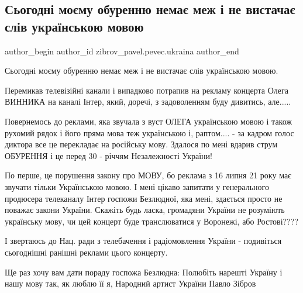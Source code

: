  
 
 
 
 
 
\subsection{Сьогодні моєму обуренню немає меж і не вистачає слів українською мовою}
\label{sec:01_08_2021.fb.zibrov_pavel.pevec.ukraina.1.kanal_inter_oleg_vinnik}
 
\ifcmt
 author_begin
   author_id zibrov_pavel.pevec.ukraina
 author_end
\fi

Сьогодні моєму обуренню немає меж і не вистачає слів українською мовою.

Перемикав телевізійні канали і випадково потрапив на рекламу концерта Олега
ВИННИКА на каналі Інтер, який, доречі, з задоволенням буду дивитись, але.....

Повернемось до реклами, яка звучала з вуст ОЛЕГА українською мовою і також
рухомий рядок і його пряма мова теж українською і, раптом.... - за кадром голос
диктора все це перекладає  на російську мову. Здалося  по мені вдарив струм
ОБУРЕННЯ і це перед 30 - річчям Незалежності України! 

По перше, це порушення закону про МОВУ, бо реклама з 16 липня 21 року має
звучати тільки Українською мовою. І мені цікаво запитати у генерального
продюсера телеканалу Інтер госпожи Безлюдної,  яка мені, здається просто не
поважає закони України. Скажіть будь ласка, громадяни України не розуміють
українську мову, чи цей концерт буде транслюватися у Воронежі, або Ростові????

І звертаюсь до Нац. ради з телебачення і радіомовлення України - подивіться
сьогоднішні ранішні реклами цього концерту.

Ще раз хочу вам дати пораду госпожа Безлюдна: Полюбіть нарешті Україну і нашу
мову так, як люблю її я, Народний артист України Павло Зібров


